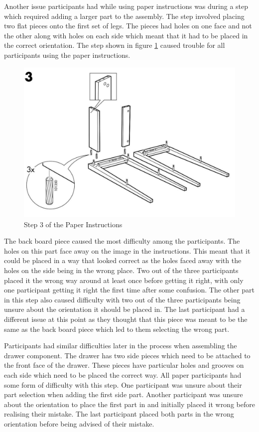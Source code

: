 \documentclass{l4proj}
\begin{document}

Another issue participants had while using paper instructions was during a step which required adding a larger part to the assembly. The step involved placing two flat pieces onto the first set of legs. The pieces had holes on one face and not the other along with holes on each side which meant that it had to be placed in the correct orientation. The step shown in figure \ref{fig:paper3} caused trouble for all participants using the paper instructions.

\begin{figure}[hbt!]
    \centering
    \includegraphics[width=0.6\linewidth]{dissertation//images/instructionsStep3.jpg}
    \caption{Step 3 of the Paper Instructions \cite{noauthor_hemnes_nodate}}
    \label{fig:paper3}
\end{figure}

The back board piece caused the most difficulty among the participants. The holes on this part face away on the image in the instructions. This meant that it could be placed in a way that looked correct as the holes faced away with the holes on the side being in the wrong place. Two out of the three participants placed it the wrong way around at least once before getting it right, with only one participant getting it right the first time after some confusion. The other part in this step also caused difficulty with two out of the three participants being unsure about the orientation it should be placed in. The last participant had a different issue at this point as they thought that this piece was meant to be the same as the back board piece which led to them selecting the wrong part.

Participants had similar difficulties later in the process when assembling the drawer component. The drawer has two side pieces which need to be attached to the front face of the drawer. These pieces have particular holes and grooves on each side which need to be placed the correct way. All paper participants had some form of difficulty with this step. One participant was unsure about their part selection when adding the first side part. Another participant was unsure about the orientation to place the first part in and initially placed it wrong before realising their mistake. The last participant placed both parts in the wrong orientation before being advised of their mistake.
\end{document}
